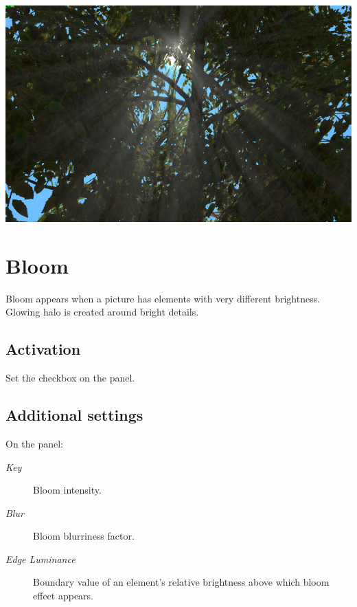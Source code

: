 \documentclass[a4paper,12pt,oneside]{sphinxmanual}
\begin{document}
{\hfill\includegraphics[width=1.000\linewidth]{god_rays.jpg}\hfill}

\begin{DUlineblock}{0em}
\item[] 
\end{DUlineblock}


\section{Bloom}
\label{postprocessing_effects:id14}
Bloom appears when a picture has elements with very different brightness. Glowing halo is created around bright details.


\subsection{Activation}
\label{postprocessing_effects:id15}
Set the  checkbox on the  panel.


\subsection{Additional settings}
\label{postprocessing_effects:id16}
On the  panel:
\begin{description}
\item[{\emph{Key}}] \leavevmode
Bloom intensity.

\item[{\emph{Blur}}] \leavevmode
Bloom blurriness factor.

\item[{\emph{Edge Luminance}}] \leavevmode
Boundary value of an element's relative brightness above which bloom effect appears.

\end{description}
\end{document}
